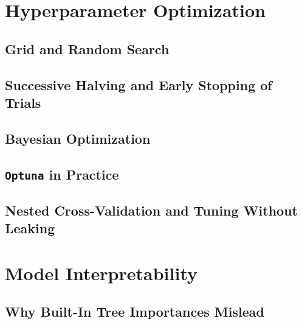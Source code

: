 \section{Hyperparameter Optimization}
\label{sec:hyperparameter-optimization}

\subsection{Grid and Random Search}

\subsection{Successive Halving and Early Stopping of Trials}

\subsection{Bayesian Optimization}


\subsection{\texttt{Optuna} in Practice}

\subsection{Nested Cross-Validation and Tuning Without Leaking}

\section{Model Interpretability}
\label{sec:interpretability}


\subsection{Why Built-In Tree Importances Mislead}

